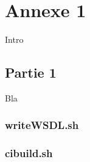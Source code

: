 \chapter*{Annexe 1}

\makeatletter
\renewcommand{\thesection}{\@arabic\c@section}
\makeatother

\setcounter{section}{0}

Intro

\section{Partie 1}

Bla

\subsection*{writeWSDL.sh}


\subsection*{cibuild.sh}
